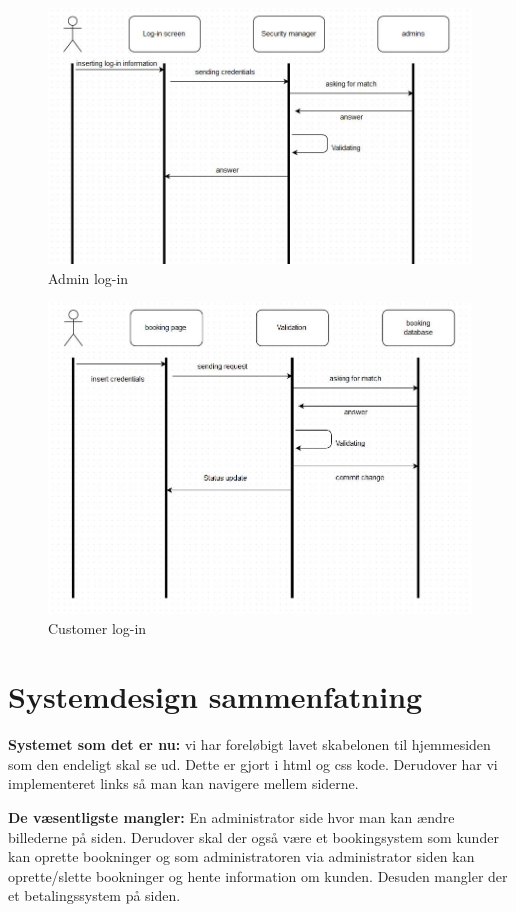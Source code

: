 \documentclass[12pt,a4paper]{article}
\begin{document}
\begin{figure}[H]
\includegraphics[scale=0.4]{adminLog-in.jpg}
\caption{Admin log-in}
\end{figure}


\begin{figure}[H]
\includegraphics[scale=0.4]{customerLog-in.jpg}
\caption{Customer log-in}
\end{figure}


\newpage
\section{Systemdesign sammenfatning}
\textbf{Systemet som det er nu:}
vi har foreløbigt lavet skabelonen til hjemmesiden som den endeligt skal se ud. Dette er gjort i html og css kode. Derudover har vi implementeret links så man kan navigere mellem siderne. 

\textbf{De væsentligste mangler:}
En administrator side hvor man kan ændre billederne på siden. 
Derudover skal der også være et bookingsystem som kunder kan oprette bookninger og som administratoren via administrator siden kan oprette/slette bookninger og hente information om kunden. Desuden mangler der et betalingssystem på siden.
\newpage
\end{document}
